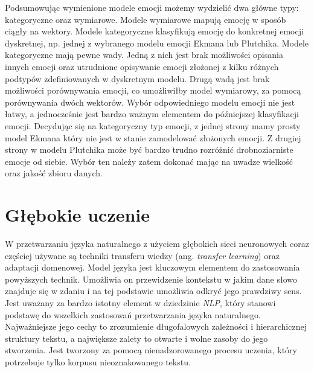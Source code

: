 Podsumowując wymienione modele emocji możemy wydzielić dwa główne typy: kategoryczne oraz wymiarowe. Modele wymiarowe mapują emocję w sposób ciągły na wektory. Modele kategoryczne klasyfikują emocję do konkretnej emocji dyskretnej, np. jednej z wybranego modelu emocji Ekmana lub Plutchika. Modele kategoryczne mają pewne wady. Jedną z nich jest brak możliwości opisania innych emocji oraz utrudnione opisywanie emocji złożonej z kilku różnych podtypów zdefiniowanych w dyskretnym modelu. Drugą wadą jest brak możliwości porównywania emocji, co umożliwiłby model wymiarowy, za pomocą porównywania dwóch wektorów. Wybór odpowiedniego modelu emocji nie jest łatwy, a jednocześnie jest bardzo ważnym elementem do późniejszej klasyfikacji emocji. Decydując się na kategoryczny typ emocji, z jednej strony mamy prosty model Ekmana który nie jest w stanie zamodelować złożonych emocji. Z drugiej strony w modelu Plutchika może być bardzo trudno rozróżnić drobnoziarniste emocje od siebie. Wybór ten należy zatem dokonać mając na uwadze wielkość oraz jakość zbioru danych.

\section{Głębokie uczenie}

W przetwarzaniu języka naturalnego z użyciem głębokich sieci neuronowych coraz częściej używane są techniki transferu wiedzy (ang. \textit{transfer learning}) oraz adaptacji domenowej. Model języka jest kluczowym elementem do zastosowania powyższych technik. Umożliwia on przewidzenie kontekstu w jakim dane słowo znajduje się w zdaniu i na tej podstawie umożliwia odkryć jego prawdziwy sens. Jest uważany za bardzo istotny element w dziedzinie \textit{NLP}, który stanowi podstawę do wszelkich zastosowań przetwarzania języka naturalnego. Najważniejsze jego cechy to zrozumienie długofalowych zależności i hierarchicznej struktury tekstu, a największe zalety to otwarte i wolne zasoby do jego stworzenia. Jest tworzony za pomocą nienadzorowanego procesu uczenia, który potrzebuje tylko korpusu nieoznakowanego tekstu.

